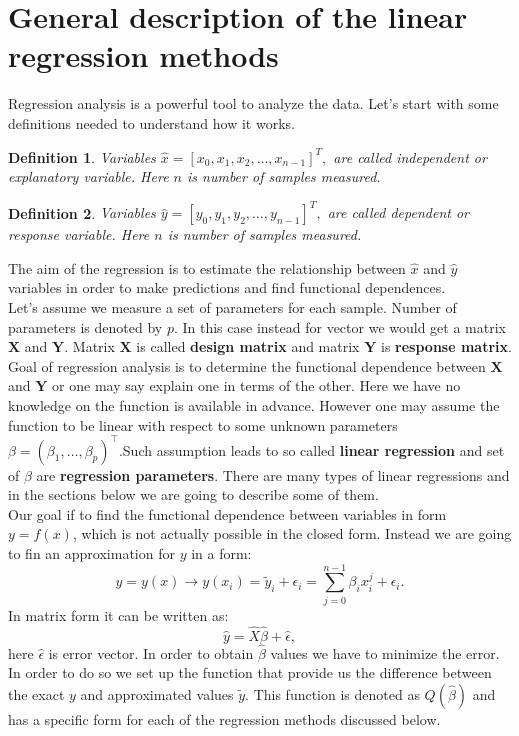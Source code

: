 \documentclass[10pt]{article}
\newtheorem{defn}{Definition}
\begin{document}
\section{General description of the linear regression methods} \label{Theory}
Regression analysis is a powerful tool to analyze the data. Let's start with some definitions needed to understand how it works.
\begin{defn}
Variables $\hat{x} = [x_0,x_1, x_2,\dots, x_{n-1}]^T,$ are called independent  or explanatory variable. Here $n$ is number of samples measured.
\end{defn}

\begin{defn}
	Variables  $\hat{y} = [y_0,y_1, y_2,\dots, y_{n-1}]^T,$ are called dependent or response variable. Here $n$ is number of samples measured.
\end{defn}
The aim of the regression is to estimate the relationship between $\hat{x}$ and $\hat{y}$ variables in order to make predictions and find functional dependences. \\
Let's assume we measure a set of parameters for each sample. Number of parameters is denoted by $p$. In this case instead for vector we would get a matrix $\textbf{X}$ and $\textbf{Y}$. Matrix $\textbf{X}$ is called \textbf{design matrix} and matrix $\textbf{Y}$ is \textbf{response matrix}. Goal of regression analysis is to determine the functional dependence between $\textbf{X}$ and $\textbf{Y}$ or one may say explain one in terms of the other. Here we have no knowledge on the function is available in advance. However one may assume the function to be linear with respect to some unknown parameters $\beta = (\beta_1, \ldots, \beta_p)^{\top}$.Such assumption leads to so called \textbf{linear regression} and set of $\beta$  are \textbf{regression parameters}. There are many types of linear regressions and in the sections below we are going to describe some of them.\\
Our goal if to find the functional dependence between variables in form $y=f(x)$, which is not actually possible in the closed form. Instead we are going to fin an approximation for $y$ in a form:
\begin{equation}
y=y(x) \rightarrow y(x_i)=\tilde{y}_i+\epsilon_i=\sum_{j=0}^{n-1} \beta_i x_i^j+\epsilon_i.
\end{equation}
In matrix form it can be written as:
\begin{equation}
\hat{y} = \hat{X}\hat{\beta}+\hat{\epsilon},
\end{equation}
here $\hat{\epsilon}$ is error vector.
In order to obtain $\hat{\beta}$ values we have to minimize the error.
In order to do so we set up the function that provide us the difference between the exact $y$ and approximated values $\tilde{y}$. This function is denoted as $Q(\hat{\beta})$ and has a specific form for each of the regression methods discussed below.
\end{document}
